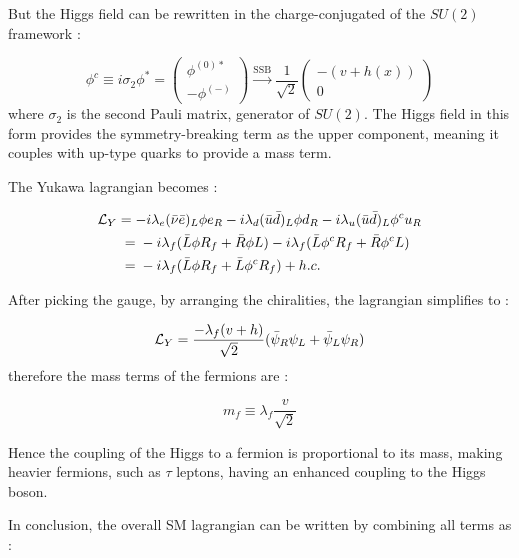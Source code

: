 But the Higgs field can be rewritten in the charge-conjugated of the $SU(2)$ framework :

\begin{equation}
    \phi^c \equiv i\sigma_2 \phi^* = \begin{pmatrix} \phi^{(0)*} \\ -\phi^{(-)} \end{pmatrix}  \xrightarrow{\text{SSB}} \frac{1}{\sqrt{2}}\begin{pmatrix} -(v+h(x)) \\ 0 \end{pmatrix} 
\end{equation}
where $\sigma_2$ is the second Pauli matrix, generator of $SU(2)$. The Higgs field in this form provides the symmetry-breaking term as the upper component, meaning it couples with up-type quarks to provide a mass term.

The Yukawa lagrangian becomes :

\begin{align}
    \MoveEqLeft[3]
    \Lagr_Y = -i\lambda_e (\Bar{\nu}\Bar{e})_L \phi e_R - i\lambda_d (\Bar{u}\Bar{d})_L \phi d_R - i\lambda_u (\Bar{u}\Bar{d})_L \phi^c u_R \\ ={}& -i\lambda_f (\Bar{L}\phi R_f + \Bar{R}\phi L) - i\lambda_f(\Bar{L}\phi^c R_f + \Bar{R}\phi^c L) \\ ={}& -i\lambda_f(\Bar{L}\phi R_f + \Bar{L}\phi^cR_f) + h.c.
\end{align}

After picking the gauge, by arranging the chiralities, the lagrangian simplifies to :

\begin{equation}
    \mathcal{L}_Y = \frac{-\lambda_f (v+h)}{\sqrt{2}}(\Bar{\psi}_R\psi_L + \Bar{\psi}_L\psi_R)
\end{equation}
therefore the mass terms of the fermions are :

\begin{equation}
    m_f \equiv \lambda_f \frac{v}{\sqrt{2}}
\end{equation}

Hence the coupling of the Higgs to a fermion is proportional to its mass, making heavier fermions, such as $\tau$ leptons, having an enhanced coupling to the Higgs boson.

In conclusion, the overall SM lagrangian can be written by combining all terms as :

